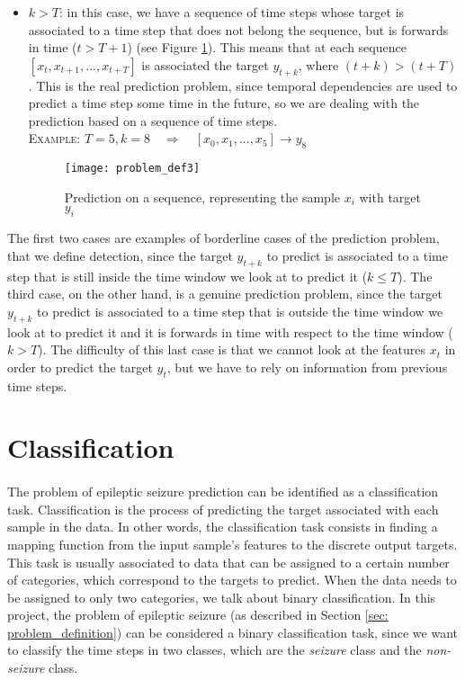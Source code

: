\begin{itemize}
    \item $k>T$: in this case, we have a sequence of time steps whose target is associated to a time step that does not belong the sequence, but is forwards in time ($t>T+1$) (see Figure \ref{fig:problem_def3}). This means that at each sequence $[x_t, x_{t+1}, ... , x_{t+T}]$ is associated the target $y_{t+k}$, where $(t+k) > (t+T)$. This is the real prediction problem, since temporal dependencies are used to predict a time step some time in the future, so we are dealing with the prediction based on a sequence of time steps.\\
    \textsc{Example:} \quad$T=5, k=8\quad \Rightarrow{}\quad [x_0, x_1, ..., x_5] \rightarrow{} y_8$
    \begin{figure}[h]
        \centering
        \texttt{[image: problem\_def3]}
        \caption{Prediction on a sequence, representing the sample $x_i$ with target $y_i$}
        \label{fig:problem_def3}
    \end{figure}
\end{itemize}
The first two cases are examples of borderline cases of the prediction problem, that we define detection, since the target $y_{t+k}$ to predict is associated to a time step that is still inside the time window we look at to predict it ($k \leq T$). The third case, on the other hand, is a genuine prediction problem, since the target $y_{t+k}$ to predict is associated to a time step that is outside the time window we look at to predict it and it is forwards in time with respect to the time window ($k > T$). The difficulty of this last case is that we cannot look at the features $x_t$ in order to predict the target $y_t$, but we have to rely on information from previous time steps.


\section{Classification} \label{sec: classification}
\paragraph{} The problem of epileptic seizure prediction can be identified as a classification task. Classification is the process of predicting the target associated with each sample in the data. In other words, the classification task consists in finding a mapping function from the input sample's features to the discrete output targets. This task is usually associated to data that can be assigned to a certain number of categories, which correspond to the targets to predict. When the data needs to be assigned to only two categories, we talk about binary classification. In this project, the problem of epileptic seizure (as described in Section \ref{sec: problem_definition}) can be considered a binary classification task, since we want to classify the time steps in two classes, which are the \textit{seizure} class and the \textit{non-seizure} class.

